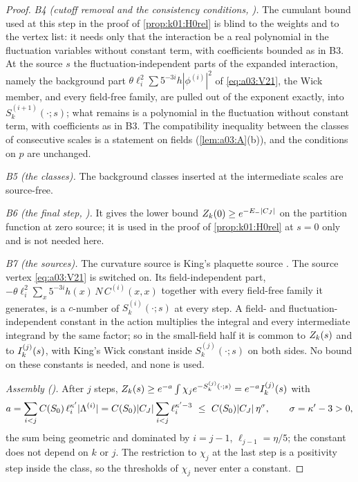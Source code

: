 \begin{proof}
\textit{B4 (cutoff removal and the consistency conditions, \cite[(3.50)--(3.55)]{Ba1}).} The cumulant bound used at this step in the proof of \cref{prop:k01:H0rel} is blind to the weights and to the vertex list: it needs only that the interaction be a real polynomial in the fluctuation variables without constant term, with coefficients bounded as in B3. At the source $s$ the fluctuation-independent parts of the expanded interaction, namely the background part $\theta\ell_i^2\sum5^{-3i}h|\phi^{(i)}|^2$ of \eqref{eq:a03:V21}, the Wick member, and every field-free family, are pulled out of the exponent exactly, into $S^{(i+1)}_k(\cdot;s)$; what remains is a polynomial in the fluctuation without constant term, with coefficients as in B3. The compatibility inequality \cite[(3.53)]{Ba1} between the classes of consecutive scales is a statement on fields (\cref{lem:a03:A}(b)), and the conditions \cite[(3.54)]{Ba1} on $p$ are unchanged.

\textit{B5 (the classes).} The background classes inserted at the intermediate scales are source-free.

\textit{B6 (the final step, \cite[(3.66)--(3.69)]{Ba1}).} It gives the lower bound $Z_{k}(0)\ge e^{-E_-|C_J|}$ on the partition function at zero source; it is used in the proof of \cref{prop:k01:H0rel} at $s=0$ only and is not needed here.

\textit{B7 (the sources).} The curvature source is King's plaquette source \cite[(2.7)]{K2}. The source vertex \eqref{eq:a03:V21} is switched on. Its field-independent part, $-\theta\ell_i^2\sum_x5^{-3i}h(x)\,N\,C^{(i)}(x,x)$ together with every field-free family it generates, is a $c$-number of $S^{(i)}_k(\cdot;s)$ at every step. A field- and fluctuation-independent constant in the action multiplies the integral and every intermediate integrand by the same factor; so in the small-field half it is common to $Z_{k}(s)$ and to $I^{(j)}_{k}(s)$, with King's Wick constant inside $S^{(j)}_k(\cdot;s)$ on both sides. No bound on these constants is needed, and none is used.

\textit{Assembly (\cite[Sect.~3, end]{Ba1}).} After $j$ steps, $Z_{k}(s)\ge e^{-a}\int\chi_je^{-S^{(j)}_k(\cdot;s)}=e^{-a}I^{(j)}_{k}(s)$ with
\[
a=\sum_{i<j}C(S_0)\,\ell_i^{\kappa'}|\Lambda^{(i)}|=C(S_0)|\CJ|\sum_{i<j}\ell_i^{\kappa'-3}\ \le\ C(S_0)|\CJ|\,\eta^{\sigma},\qquad\sigma=\kappa'-3>0,
\]
the sum being geometric and dominated by $i=j-1$, $\ell_{j-1}=\eta/5$; the constant does not depend on $k$ or $j$. The restriction to $\chi_j$ at the last step is a positivity step inside the class, so the thresholds of $\chi_j$ never enter a constant.


\end{proof}
